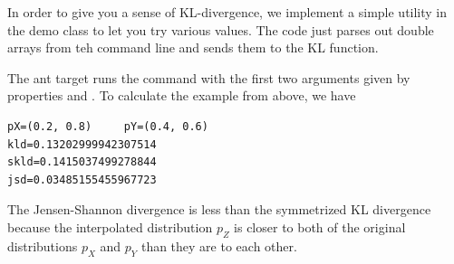 In order to give you a sense of KL-divergence, we implement a simple
utility in the demo class  to let you try various
values.  The code just parses out double arrays from teh command line
and sends them to the KL function.
%

The ant target  runs the command with the first two arguments
given by properties  and .  To calculate the example
from above, we have
%
\begin{verbatim}
pX=(0.2, 0.8)     pY=(0.4, 0.6)     
kld=0.13202999942307514    
skld=0.1415037499278844   
jsd=0.03485155455967723
\end{verbatim}
%
The Jensen-Shannon divergence is less than the symmetrized KL
divergence because the interpolated distribution $p_Z$ is closer to
both of the original distributions $p_X$ and $p_Y$ than they are to
each other.

